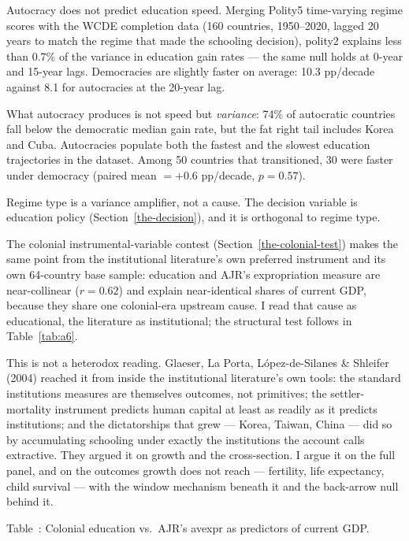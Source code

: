 \documentclass[12pt,letterpaper]{article}
\begin{document}
Autocracy does not predict education speed. Merging Polity5 time-varying regime scores with the WCDE completion data (160 countries, 1950--2020, lagged 20 years to match the regime that made the schooling decision), polity2 explains less than 0.7\% of the variance in education gain rates --- the same null holds at 0-year and 15-year lags. Democracies are slightly faster on average: 10.3 pp/decade against 8.1 for autocracies at the 20-year lag.

What autocracy produces is not speed but \emph{variance}: 74\% of autocratic countries fall below the democratic median gain rate, but the fat right tail includes Korea and Cuba. Autocracies populate both the fastest and the slowest education trajectories in the dataset. Among 50 countries that transitioned, 30 were faster under democracy (paired mean $= +0.6$ pp/decade, $p = 0.57$).

Regime type is a variance amplifier, not a cause. The decision variable is education policy (Section~\ref{the-decision}), and it is orthogonal to regime type.

The colonial instrumental-variable contest (Section~\ref{the-colonial-test}) makes the same point from the institutional literature's own preferred instrument and its own 64-country base sample: education and AJR's expropriation measure are near-collinear ($r=0.62$) and explain near-identical shares of current GDP, because they share one colonial-era upstream cause. I read that cause as educational, the literature as institutional; the structural test follows in Table~\ref{tab:a6}.

This is not a heterodox reading. Glaeser, La Porta, López-de-Silanes \& Shleifer (2004) reached it from inside the institutional literature's own tools: the standard institutions measures are themselves outcomes, not primitives; the settler-mortality instrument predicts human capital at least as readily as it predicts institutions; and the dictatorships that grew --- Korea, Taiwan, China --- did so by accumulating schooling under exactly the institutions the account calls extractive. They argued it on growth and the cross-section. I argue it on the full panel, and on the outcomes growth does not reach --- fertility, life expectancy, child survival --- with the window mechanism beneath it and the back-arrow null behind it.

\label{tab:a6}Table~\thetable: Colonial education vs.~AJR's avexpr as predictors of current GDP.
\end{document}
